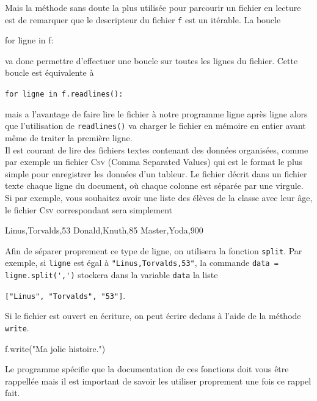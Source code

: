 \documentclass{magnolia}
\begin{document}
Mais la méthode sans doute la plus utilisée pour parcourir un fichier
en lecture est de remarquer que le descripteur du fichier \verb!f! est un itérable.
La boucle
\begin{pythoncode}
for ligne in f:
\end{pythoncode}
va donc permettre d'effectuer une boucle sur toutes les lignes du fichier. Cette boucle
est équivalente à
\begin{center}
  \verb!for ligne in f.readlines():!
\end{center}
mais a l'avantage de faire lire le fichier à notre programme ligne après ligne alors que
l'utilisation de \verb!readlines()! va charger le fichier en mémoire en entier avant même
de traiter la première ligne.\\

Il est courant de lire des fichiers textes contenant des données organisées, comme
par exemple un fichier \textsc{Csv} (Comma Separated Values) qui est le format le
plus simple pour enregistrer les données d'un tableur. Le fichier décrit dans un fichier
texte chaque ligne du document, où chaque colonne est séparée par une virgule. Si par
exemple, vous souhaitez avoir une liste des élèves de la classe avec leur âge, le fichier
\textsc{Csv} correspondant sera simplement
\begin{pythoncode}
Linus,Torvalds,53
Donald,Knuth,85
Master,Yoda,900
\end{pythoncode}
Afin de séparer proprement ce type de ligne, on utilisera la fonction \verb!split!.
Par exemple, si \verb!ligne! est égal à \verb!"Linus,Torvalds,53"!, la commande
\verb!data = ligne.split(',')! stockera dans la variable \verb!data! la liste
\begin{center}
\verb!["Linus", "Torvalds", "53"]!.
\end{center}

Si le fichier est ouvert en écriture, on peut écrire dedans à l'aide de la méthode
\verb!write!.
\begin{pythoncode}
f.write("Ma jolie histoire.")
\end{pythoncode}

\medskip
Le programme spécifie que la documentation de ces fonctions doit vous être rappellée
mais il est important de savoir les utiliser proprement une fois ce rappel fait.


\end{document}
